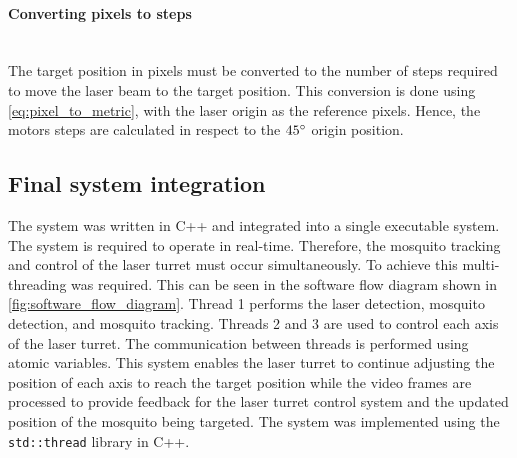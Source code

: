 \paragraph{Converting pixels to steps}\mbox{}\\
The target position in pixels must be converted to the number of steps required to move the laser beam to the target position. This conversion is done using \autoref{eq:pixel_to_metric}, with the laser origin as the reference pixels. Hence, the motors steps are calculated in respect to the $45^{\circ}$ origin position.

\subsection{Final system integration}\label{subsec:integration}
The system was written in C++ and integrated into a single executable system. The system is required to operate in real-time. Therefore, the mosquito tracking and control of the laser turret must occur simultaneously. To achieve this multi-threading was required. This can be seen in the software flow diagram shown in \autoref{fig:software_flow_diagram}. Thread 1 performs the laser detection, mosquito detection, and mosquito tracking. Threads 2 and 3 are used to control each axis of the laser turret. The communication between threads is performed using atomic variables. This system enables the laser turret to continue adjusting the position of each axis to reach the target position while the video frames are processed to provide feedback for the laser turret control system and the updated position of the mosquito being targeted. The system was implemented using the \texttt{std::thread} library in C++.

